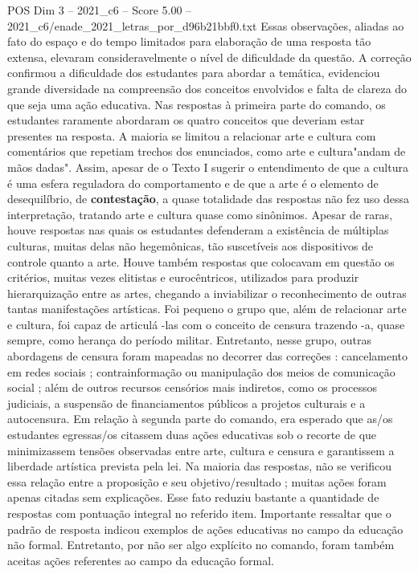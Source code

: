 \begin{textsample}{POS Dim 3 – 2021\_c6 – Score 5.00 – 2021\_c6/enade\_2021\_letras\_por\_d96b21bbf0.txt}
Essas observações, aliadas ao fato do espaço e do tempo limitados para elaboração de uma resposta tão extensa, elevaram consideravelmente o nível de dificuldade da questão.
A correção confirmou a dificuldade dos estudantes para abordar a temática, evidenciou grande diversidade na compreensão dos conceitos envolvidos e falta de clareza do que seja uma ação educativa.
Nas respostas à primeira parte do comando, os estudantes raramente abordaram os quatro conceitos que deveriam estar presentes na resposta.
A maioria se limitou a relacionar arte e cultura com comentários que repetiam trechos dos enunciados, como arte e cultura"andam de mãos dadas".
Assim, apesar de o Texto I sugerir o entendimento de que a cultura é uma esfera reguladora do comportamento e de que a arte é o elemento de desequilíbrio, de \textbf{contestação}, a quase totalidade das respostas não fez uso dessa interpretação, tratando arte e cultura quase como sinônimos.
Apesar de raras, houve respostas nas quais os estudantes defenderam a existência de múltiplas culturas, muitas delas não hegemônicas, tão suscetíveis aos dispositivos de controle quanto a arte.
Houve também respostas que colocavam em questão os critérios, muitas vezes elitistas e eurocêntricos, utilizados para produzir hierarquização entre as artes, chegando a inviabilizar o reconhecimento de outras tantas manifestações artísticas.
Foi pequeno o grupo que, além de relacionar arte e cultura, foi capaz de articulá -las com o conceito de censura trazendo -a, quase sempre, como herança do período militar.
Entretanto, nesse grupo, outras abordagens de censura foram mapeadas no decorrer das correções : cancelamento em redes sociais ; contrainformação ou manipulação dos meios de comunicação social ; além de outros recursos censórios mais indiretos, como os processos judiciais, a suspensão de financiamentos públicos a projetos culturais e a autocensura.
Em relação à segunda parte do comando, era esperado que as/os estudantes egressas/os citassem duas ações educativas sob o recorte de que minimizassem tensões observadas entre arte, cultura e censura e garantissem a liberdade artística prevista pela lei.
Na maioria das respostas, não se verificou essa relação entre a proposição e seu objetivo/resultado ; muitas ações foram apenas citadas sem explicações.
Esse fato reduziu bastante a quantidade de respostas com pontuação integral no referido item.
Importante ressaltar que o padrão de resposta indicou exemplos de ações educativas no campo da educação não formal.
Entretanto, por não ser algo explícito no comando, foram também aceitas ações referentes ao campo da educação formal.

\end{textsample}
